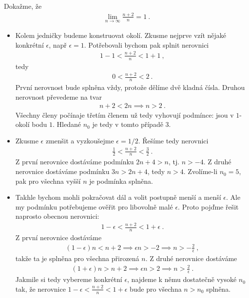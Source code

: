 \begin{example}
    Dokažme, že
    \begin{align}
        \lim_{n \rightarrow \infty} \frac{n+2}{n} = 1 \:.
    \end{align}
    \begin{itemize}
        \item Kolem jedničky budeme konstruovat okolí. Zkusme nejprve vzít nějaké konkrétní $\epsilon$, např $\epsilon = 1$. Potřebovali bychom pak splnit nerovnici
        \begin{align}
            1 - 1 < \frac{n+2}{n} < 1 + 1 \:,
        \end{align}
        tedy 
        \begin{align}
            0 < \frac{n+2}{n} < 2 \:.
        \end{align}
        První nerovnost bude splněna vždy, protože dělíme dvě kladná čísla. Druhou nerovnost převedeme na tvar
        \begin{align}
            n+2 < 2n \implies n > 2 \:.
        \end{align}
        Všechny členy počínaje třetím členem už tedy vyhovují podmínce: jsou v $1$-okolí bodu $1$. Hledané $n_0$ je tedy v tomto případě $3$.

        \item Zkusme $\epsilon$ zmenšit a vyzkoušejme $\epsilon = 1/2$. Řešíme tedy nerovnici
        \begin{align}
            \frac{1}{2} < \frac{n+2}{n} < \frac{3}{2} \:.
        \end{align}
        Z první nerovnice dostáváme podmínku $2n+4 > n$, tj. $n>-4$. Z druhé nerovnice dostáváme podmínku $3n> 2n+4$, tedy $n>4$. Zvolíme-li $n_0=5$, pak pro všechna vyšší $n$ je podmínka splněna.

        \item Takhle bychom mohli pokračovat dál a volit postupně menší a menší $\epsilon$. Ale my podmínku potřebujeme ověřit pro libovolně malé $\epsilon$. Proto pojďme řešit naprosto obecnou nerovnici:
        \begin{align}
            1-\epsilon < \frac{n+2}{n} < 1+\epsilon \:.
        \end{align}
        Z první nerovnice dostáváme
        \begin{align}
            (1-\epsilon)n < n+2 \implies \epsilon n > -2 \implies n > -\frac{2}{\epsilon} \:,
        \end{align}
        takže ta je splněna pro všechna přirozená $n$.
        Z druhé nerovnice dostáváme
        \begin{align}
            (1+\epsilon)n > n+2 \implies \epsilon n > 2 \implies n > \frac{2}{\epsilon} \:.
        \end{align}
        Jakmile si tedy vybereme konkrétní $\epsilon$, najdeme k němu dostatečně vysoké $n_0$ tak, že nerovnice $1-\epsilon < \frac{n+2}{n} < 1 + \epsilon$ bude pro všechna $n>n_0$ splněna. 
        

\end{itemize}
\end{example}
